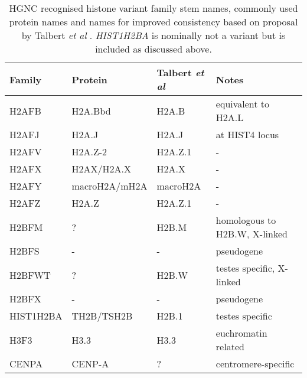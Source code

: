 \begin{table*}[htp]
	\caption{HGNC recognised histone variant family stem names, commonly used protein names 
	and names for improved consistency based on proposal by Talbert \textit{et al} \citep{Talbert2012}. 
	\textit{HIST1H2BA} is nominally not a variant but is included as discussed above.}
	\label{tab:histone-variant-families}
	\centering
	\begin{tabular}{l l l l}
	\toprule
	Family & Protein & Talbert \textit{et al} & Notes \\
	\midrule
	H2AFB & H2A.Bbd & H2A.B & equivalent to H2A.L \\
	H2AFJ & H2A.J & H2A.J & at HIST4 locus \\
	H2AFV & H2A.Z-2 & H2A.Z.1 & - \\
	H2AFX & H2AX/H2A.X & H2A.X & - \\
	H2AFY & macroH2A/mH2A & macroH2A & - \\
	H2AFZ & H2A.Z & H2A.Z.1 & - \\
	H2BFM & ? & H2B.M & homologous to H2B.W, X-linked\\
	H2BFS & - & - & pseudogene \\
	H2BFWT & ? & H2B.W & testes specific, X-linked \\
	H2BFX & - & - & pseudogene \\
	HIST1H2BA & TH2B/TSH2B & H2B.1 & testes specific \\
	H3F3 & H3.3 & H3.3 & euchromatin related \\
	CENPA & CENP-A & ? & centromere-specific \\
	\bottomrule
	\end{tabular}
\end{table*}